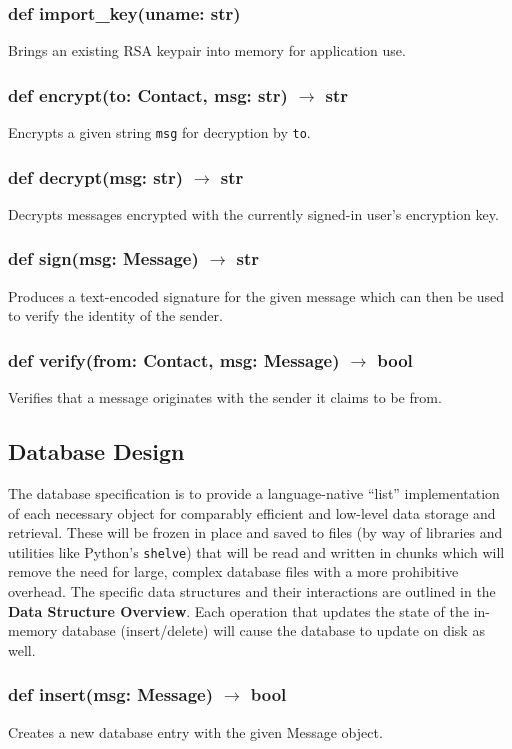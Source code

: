 \documentclass[titlepage]{report}
\begin{document}
\subsubsection{def import\_key(uname: str)}
Brings an existing RSA keypair into memory for application use.
\subsubsection{def encrypt(to: Contact, msg: str) $\rightarrow$ str}
Encrypts a given string \texttt{msg} for decryption by \texttt{to}.
\subsubsection{def decrypt(msg: str) $\rightarrow$ str}
Decrypts messages encrypted with the currently signed-in user's encryption key.
\subsubsection{def sign(msg: Message) $\rightarrow$ str}
Produces a text-encoded signature for the given message which can then be used to verify the identity of the sender.
\subsubsection{def verify(from: Contact, msg: Message) $\rightarrow$ bool}
Verifies that a message originates with the sender it claims to be from.

\subsection{Database Design}
The database specification is to provide a language-native ``list'' implementation of each necessary object for comparably efficient and low-level data storage and retrieval. These will be frozen in place and saved to files (by way of libraries and utilities like Python's \texttt{shelve}) that will be read and written in chunks which will remove the need for large, complex database files with a more prohibitive overhead. The specific data structures and their interactions are outlined in the \textbf{Data Structure Overview}. Each operation that updates the state of the in-memory database (insert/delete) will cause the database to update on disk as well.

\subsubsection{def insert(msg: Message) $\rightarrow$ bool}
Creates a new database entry with the given Message object.
\end{document}
